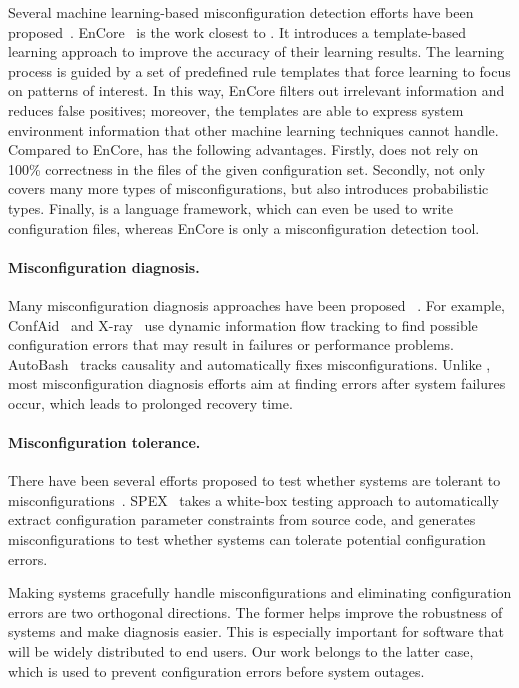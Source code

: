 Several machine learning-based misconfiguration detection efforts 
have been proposed~\cite{yuan11context, zhang14encore}.
EnCore~\cite{zhang14encore} is the work closest to \app.
It introduces a template-based
learning approach to improve the accuracy of their learning results.
The learning process is guided by a set of predefined rule templates
that force learning to focus on patterns of interest.
In this way, EnCore filters out irrelevant information and reduces
false positives; moreover, the templates are able to express
system environment information that other machine learning
techniques cannot handle.
Compared to EnCore, \app has the following advantages.
Firstly, \app does not rely on 100\% correctness in the files of the given configuration set. 
Secondly, \app not only covers many more types of 
misconfigurations, but also introduces probabilistic types.
Finally, \app is a language framework, which can 
even be used to write configuration files, whereas EnCore is only a 
misconfiguration detection tool.

\paragraph{Misconfiguration diagnosis.}
Many misconfiguration diagnosis approaches have been proposed%
~\cite{attariyan10automating, attariyan12x-ray}.
For example, ConfAid~\cite{attariyan10automating} 
and X-ray~\cite{attariyan12x-ray} use dynamic information
flow tracking to find possible configuration errors that may result in
failures or performance problems. AutoBash~\cite{su07autobash} 
tracks causality and automatically fixes 
misconfigurations. Unlike \app, most misconfiguration
diagnosis efforts aim at finding errors after system
failures occur, which leads to prolonged recovery time.

\paragraph{Misconfiguration tolerance.}
There have been several efforts proposed to test whether systems are 
tolerant to misconfigurations~\cite{xu13do}. 
SPEX~\cite{xu13do} takes a white-box testing approach to automatically
extract configuration parameter constraints from source code, and generates 
misconfigurations to test whether systems can tolerate potential
configuration errors.

Making systems gracefully handle misconfigurations and eliminating
configuration errors are two orthogonal directions.
The former helps improve the robustness of systems and make 
diagnosis easier. This is especially important for 
software that will be widely distributed to end users.
Our work belongs to the latter case, which is used to 
prevent configuration errors before system outages.
